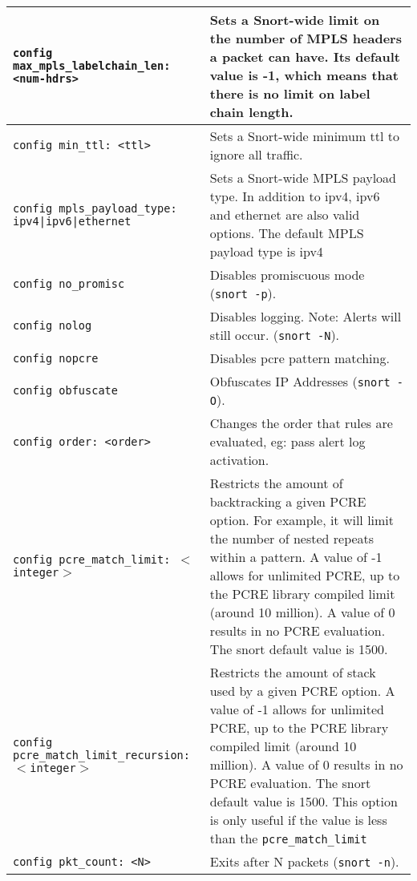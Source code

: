 \documentclass[english]{report}
\begin{document}
\begin{center}
\begin{longtable}[t]{| p{2.5in} | p{3.5in} |}
\hline
\texttt{config max\_mpls\_labelchain\_len: <num-hdrs>} & Sets a Snort-wide
limit on the number of MPLS headers a packet can have. Its default value is -1,
which means that there is no limit on label chain length.\\

\hline
\texttt{config min\_ttl: <ttl>} & Sets a Snort-wide minimum ttl to ignore all
traffic. \\

\hline
\texttt{config mpls\_payload\_type: ipv4|ipv6|ethernet} & Sets a Snort-wide
MPLS payload type. In addition to ipv4, ipv6 and ethernet are also valid
options. The default MPLS payload type is ipv4\\

\hline
\texttt{config no\_promisc} & Disables promiscuous mode (\texttt{snort -p}). \\

\hline
\texttt{config nolog} & Disables logging. Note: Alerts will still occur.
(\texttt{snort -N}). \\

\hline
\texttt{config nopcre} & Disables pcre pattern matching. \\

\hline
\texttt{config obfuscate} & Obfuscates IP Addresses (\texttt{snort -O}). \\

\hline
\texttt{config order: <order>} & Changes the order that rules
are evaluated, eg: pass alert log activation. \\

\hline
\texttt{config pcre\_match\_limit: $<$integer$>$} & Restricts the amount of
backtracking a given PCRE option.  For example, it will limit the number of
nested repeats within a pattern.  A value of -1 allows for unlimited PCRE, up
to the PCRE library compiled limit (around 10 million).  A value of 0 results
in no PCRE evaluation.  The snort default value is 1500.  \\

\hline
\texttt{config pcre\_match\_limit\_recursion: $<$integer$>$} & Restricts the
amount of stack used by a given PCRE option.  A value of -1 allows for
unlimited PCRE, up to the PCRE library compiled limit (around 10 million).  A
value of 0 results in no PCRE evaluation.  The snort default value is 1500.
This option is only useful if the value is less than the
\texttt{pcre\_match\_limit} \\

\hline
\texttt{config pkt\_count: <N>} & Exits after N packets (\texttt{snort -n}). \\


\end{longtable}
\end{center}
\end{document}
